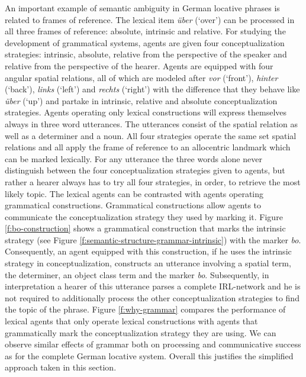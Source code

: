 An important example of semantic ambiguity in German locative phrases is related to
frames of reference. The lexical item  \textit{über} (`over') can
be processed in all three frames of reference: absolute, intrinsic and relative.
For studying the development of grammatical systems, agents are given four conceptualization
strategies: intrinsic, absolute, relative from the perspective of the speaker and relative
from the perspective of the hearer. Agents are equipped with four angular spatial relations, 
all of which are modeled after \textit{vor} (`front'), \textit{hinter} (`back'), \textit{links} (`left') and \textit{rechts} (`right') with the difference
that they behave like \textit{über} (`up') and partake in intrinsic, relative and absolute conceptualization strategies. 
Agents operating only lexical constructions will express themselves always in three word
utterances. The utterances consist of the spatial relation as well as a determiner and a noun. 
All four strategies operate the same set spatial relations and all apply the frame of reference 
to an allocentric landmark which can be marked
lexically. For any utterance the three words alone never distinguish between the 
four conceptualization strategies given to
agents, but rather a hearer always has to try all four strategies, in order, to retrieve the most likely
topic. The lexical agents can be contrasted with agents operating grammatical constructions.
Grammatical constructions allow agents to communicate the conceptualization strategy they used
by marking it. Figure \ref{f:bo-construction} shows a grammatical construction that marks the intrinsic strategy  
(see Figure \ref{f:semantic-structure-grammar-intrinsic})
with the marker \textit{bo}. Consequently, an agent equipped with this construction,
if he uses the intrinsic strategy in conceptualization, constructs an utterance involving 
a spatial term, the determiner, an object class term and the marker \textit{bo}. Subsequently, in interpretation a hearer of this utterance parses a complete IRL-network and he is not required to additionally process the other conceptualization strategies to find the topic of 
the phrase. Figure \ref{f:why-grammar} compares the performance of lexical agents that 
only operate lexical constructions with agents that grammatically mark the 
conceptualization strategy they are using. We can observe similar effects of grammar 
both on processing and communicative success as for the complete
German locative system. Overall this justifies the simplified approach taken in this section.

